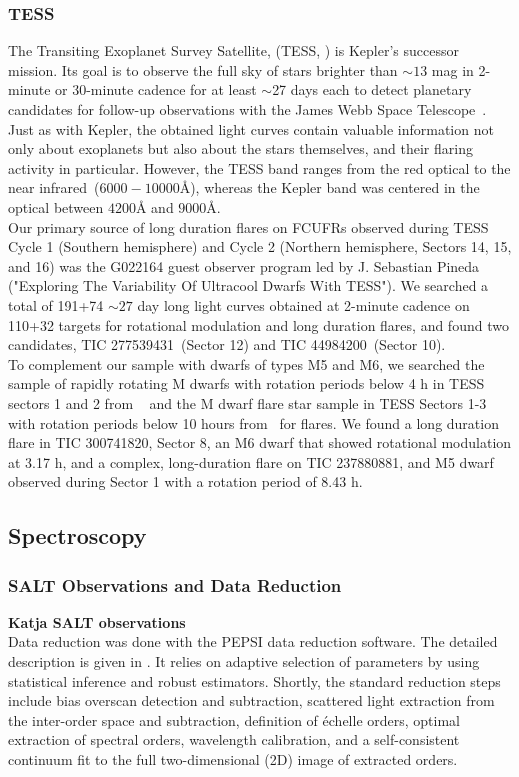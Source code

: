\documentclass[fleqn,usenatbib,letters]{mnras}%
\newcommand{\FA}{TIC 277539431} %
\newcommand{\FB}{TIC 44984200} %
\newcommand{\FC}{TIC 237880881} %
\newcommand{\FF}{TIC 300741820} %
\begin{document}
\subsubsection{TESS}
\label{sec:photometryTESS}
The Transiting Exoplanet Survey Satellite, (TESS, \citealt{ricker2015}) is Kepler's successor mission. Its goal is to observe the full sky of stars brighter than $\sim13$ mag in 2-minute or 30-minute cadence for at least $\sim$27 days each to detect planetary candidates for follow-up observations with the James Webb Space Telescope~\citep{gardner2006}. Just as with Kepler, the obtained light curves contain valuable information not only about exoplanets but also about the stars themselves, and their flaring activity in particular. However, the TESS band ranges from the red optical to the near infrared~($6000-10000$\AA), whereas the Kepler band was centered in the optical between $4200$\AA\; and $9000$\AA. 
\\
Our primary source of long duration flares on FCUFRs observed during TESS Cycle 1 (Southern hemisphere) and Cycle 2 (Northern hemisphere, Sectors 14, 15, and 16) was the G022164 guest observer program led by J. Sebastian Pineda ("Exploring The Variability Of Ultracool Dwarfs With TESS"). We searched a total of 191+74 $\sim 27$ day long light curves obtained at 2-minute cadence on 110+32 targets for rotational modulation and long duration flares, and found two candidates, \FA~(Sector 12) and \FB~(Sector 10).
\\
To complement our sample with dwarfs of types M5 and M6, we searched the sample of rapidly rotating M dwarfs with rotation periods below 4 h in TESS sectors 1 and 2 from ~\citet{zhan2019} and the M dwarf flare star sample in TESS Sectors 1-3 with rotation periods below 10 hours from~\citet{doyle2019} for flares. We found a long duration flare in \FF, Sector 8, an M6 dwarf that showed rotational modulation at 3.17 h, and a complex, long-duration flare on \FC, and M5 dwarf observed during Sector 1 with a rotation period of 8.43 h.
\subsection{Spectroscopy}
\label{sec:salt}
\subsubsection{SALT Observations and Data Reduction}
\textcolor{r}{\textbf{Katja SALT observations}}
\\
Data reduction was done with the PEPSI data reduction software. The detailed description is given in
\citet{2018Strassmeier}.
It relies on adaptive selection of parameters by using statistical inference
and robust estimators. Shortly, the standard reduction steps include bias overscan
detection and subtraction, scattered light extraction from the inter-order
space and subtraction, definition of \'echelle orders, optimal extraction of
spectral orders, wavelength calibration, and a self-consistent continuum fit
to the full two-dimensional (2D) image of extracted orders.
\end{document}

